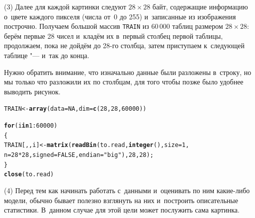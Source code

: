\documentclass[final,pdftex]{../../template/epsilonj}\usepackage[]{graphicx}\usepackage[]{color}
\makeatletter
\newcommand{\hlnum}[1]{\textcolor[rgb]{0.686,0.059,0.569}{#1}}%
\newcommand{\hlstr}[1]{\textcolor[rgb]{0.192,0.494,0.8}{#1}}%
\newcommand{\hlopt}[1]{\textcolor[rgb]{0,0,0}{#1}}%
\newcommand{\hlstd}[1]{\textcolor[rgb]{0.345,0.345,0.345}{#1}}%
\newcommand{\hlkwa}[1]{\textcolor[rgb]{0.161,0.373,0.58}{\textbf{#1}}}%
\newcommand{\hlkwb}[1]{\textcolor[rgb]{0.69,0.353,0.396}{#1}}%
\newcommand{\hlkwc}[1]{\textcolor[rgb]{0.333,0.667,0.333}{#1}}%
\newcommand{\hlkwd}[1]{\textcolor[rgb]{0.737,0.353,0.396}{\textbf{#1}}}%
\newenvironment{kframe}{%
 \def\at@end@of@kframe{}%
 \ifinner\ifhmode%
  \def\at@end@of@kframe{\end{minipage}}%
  \begin{minipage}{\columnwidth}%
 \fi\fi%
 \def\FrameCommand##1{\hskip\@totalleftmargin \hskip-\fboxsep
 \colorbox{shadecolor}{##1}\hskip-\fboxsep
     \hskip-\linewidth \hskip-\@totalleftmargin \hskip\columnwidth}%
 \MakeFramed {\advance\hsize-\width
   \@totalleftmargin\z@ \linewidth\hsize
   \@setminipage}}%
 {\par\unskip\endMakeFramed%
 \at@end@of@kframe}
\newenvironment{knitrout}{}{} %
\makeatother
\begin{document}
\par\medskip (3) Далее для каждой картинки следуют $28\times28$ байт, содержащие информацию о~цвете каждого пикселя (числа от~0 до 255) и~записанные из изображения построчно. 
Получаем большой массив \texttt{TRAIN} из 60\,000 таблиц размером $28\times28$: берём первые 28 чисел и~кладём их в~первый столбец первой таблицы, продолжаем, пока не дойдём до 28-го столбца, затем приступаем к~следующей таблице "--- и~так до конца. 

Нужно обратить внимание, что изначально данные были разложены в~строку, но мы только что разложили их по столбцам, для того чтобы позже было удобнее выводить рисунок.

\begin{knitrout}
\color{fgcolor}\begin{kframe}
\begin{alltt}
\hlstd{TRAIN} \hlkwb{<-} \hlkwd{array}\hlstd{(}\hlkwc{data} \hlstd{=} \hlnum{NA}\hlstd{,} \hlkwc{dim} \hlstd{=} \hlkwd{c}\hlstd{(}\hlnum{28}\hlstd{,}\hlnum{28}\hlstd{,}\hlnum{60000}\hlstd{))}

\hlkwa{for}\hlstd{(i} \hlkwa{in} \hlnum{1}\hlopt{:}\hlnum{60000}\hlstd{)}
  \hlstd{\{}
\hlstd{TRAIN[,,i]} \hlkwb{<-} \hlkwd{matrix}\hlstd{(}\hlkwd{readBin}\hlstd{(to.read,}\hlkwd{integer}\hlstd{(),} \hlkwc{size} \hlstd{=} \hlnum{1}\hlstd{,}
    \hlkwc{n} \hlstd{=} \hlnum{28}\hlopt{*}\hlnum{28}\hlstd{,} \hlkwc{signed} \hlstd{=} \hlnum{FALSE}\hlstd{,} \hlkwc{endian} \hlstd{=} \hlstr{"big"}\hlstd{),} \hlnum{28}\hlstd{,} \hlnum{28}\hlstd{);}
  \hlstd{\}}
\hlkwd{close}\hlstd{(to.read)}
\end{alltt}
\end{kframe}
\end{knitrout}

\par\medskip (4) Перед тем как начинать работать с~данными и~оценивать по ним какие-либо модели, обычно бывает полезно взглянуть на них и~построить описательные статистики. В~данном случае для этой цели может послужить сама картинка.
\end{document}
